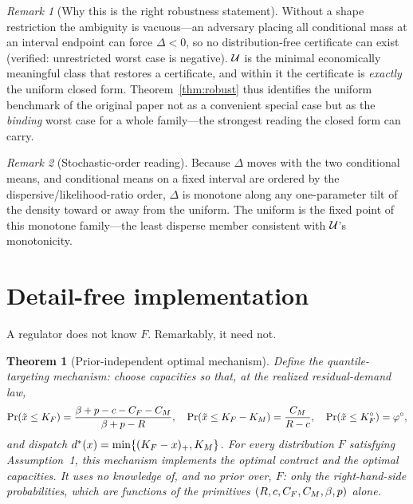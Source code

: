 \documentclass[11pt,reqno]{amsart}
\theoremstyle{plain}
\newtheorem{theorem}{Theorem}\newtheorem{proposition}{Proposition}
\theoremstyle{definition}\newtheorem{definition}{Definition}\newtheorem{assumption}{Assumption}
\theoremstyle{remark}\newtheorem{remark}{Remark}
\newcommand{\dstar}{d^{*}}
\begin{document}
\begin{remark}[Why this is the right robustness statement]
Without a shape restriction the ambiguity is vacuous---an adversary placing all
conditional mass at an interval endpoint can force $\Delta<0$, so no
distribution-free certificate can exist (verified: unrestricted worst case is
negative). $\mathcal U$ is the minimal economically meaningful class that restores a
certificate, and within it the certificate is \emph{exactly} the uniform
closed form. Theorem~\ref{thm:robust} thus identifies the uniform benchmark of the
original paper not as a convenient special case but as the \emph{binding} worst
case for a whole family---the strongest reading the closed form can carry.
\end{remark}

\begin{remark}[Stochastic-order reading]
Because $\Delta$ moves with the two conditional means, and conditional means on a
fixed interval are ordered by the dispersive/likelihood-ratio order, $\Delta$ is
monotone along any one-parameter tilt of the density toward or away from the
uniform. The uniform is the fixed point of this monotone family---the least
disperse member consistent with $\mathcal U$'s monotonicity.
\end{remark}

\section{Detail-free implementation}\label{sec:detailfree}

A regulator does not know $F$. Remarkably, it need not.

\begin{theorem}[Prior-independent optimal mechanism]\label{thm:detailfree}
Define the \emph{quantile-targeting mechanism}: choose capacities so that, at the
realized residual-demand law,
\[
  \Pr(\tilde x\le K_F)=\frac{\beta+p-c-C_F-C_M}{\beta+p-R},\quad
  \Pr(\tilde x\le K_F-K_M)=\frac{C_M}{R-c},\quad
  \Pr(\tilde x\le K_F^{\circ})=\varphi^{\circ},
\]
and dispatch $\dstar(x)=\min\{(\KF-x)_+,\KM\}$. For \emph{every} distribution $F$
satisfying Assumption~1, this mechanism implements the optimal contract and the
optimal capacities. It uses no knowledge of, and no prior over, $F$: only the
right-hand-side probabilities, which are functions of the primitives
$(R,c,C_F,C_M,\beta,p)$ alone.
\end{theorem}
\end{document}
